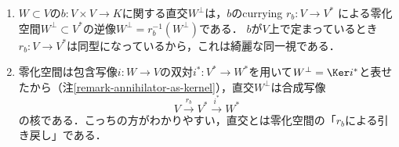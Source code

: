 \documentclass[uplatex, dvipdfmx]{jsreport}
\begin{document}
\begin{remark}\label{remark-orthogonal-as-kernel}\mbox{}
    \begin{enumerate}
        \item $W\subset V$の$b:V\times V\to K$に関する直交$W^\perp$は，$b$のcurrying $r_b:V\to V^*$
        による零化空間$W^\bot\subset V^*$の逆像$W^\perp=r_b^{-1}(W^\bot)$である．
        $b$が$V$上で定まっているとき$r_b:V\to V^*$は同型になっているから，これは綺麗な同一視である．
        \item 零化空間は包含写像$i:W\to V$の双対$i^*:V^*\to W^*$を用いて$W^\bot=\Ker i^*$と表せたから（注\ref{remark-annihilator-as-kernel}），直交$W^\perp$は合成写像
        \[V\xrightarrow{r_b}V^*\xrightarrow{i^*}W^*\]
        の核である．こっちの方がわかりやすい，直交とは零化空間の「$r_b$による引き戻し」である．
    \end{enumerate}
\end{remark}
\end{document}
